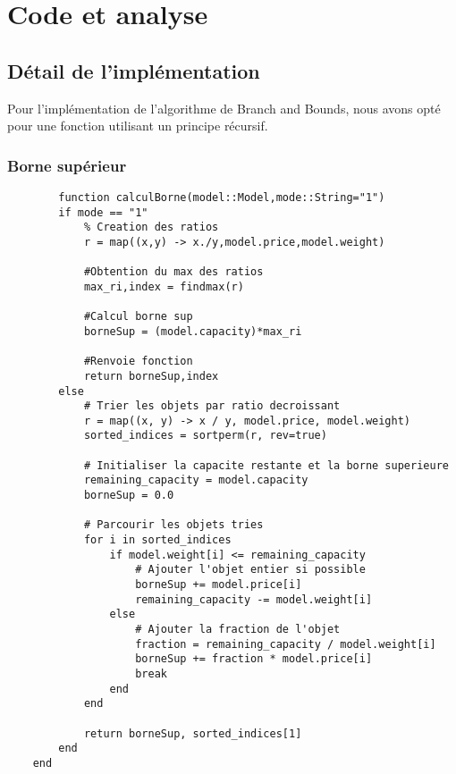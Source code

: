 \section {Code et analyse}
\subsection{Détail de l'implémentation}

Pour l'implémentation de l'algorithme de Branch and Bounds, nous avons opté pour une fonction utilisant un principe récursif.

\subsubsection{Borne supérieur}

\begin{lstlisting}
        function calculBorne(model::Model,mode::String="1")
        if mode == "1"
            % Creation des ratios
            r = map((x,y) -> x./y,model.price,model.weight)
    
            #Obtention du max des ratios
            max_ri,index = findmax(r)
    
            #Calcul borne sup
            borneSup = (model.capacity)*max_ri
    
            #Renvoie fonction
            return borneSup,index
        else
            # Trier les objets par ratio decroissant
            r = map((x, y) -> x / y, model.price, model.weight)
            sorted_indices = sortperm(r, rev=true)
            
            # Initialiser la capacite restante et la borne superieure
            remaining_capacity = model.capacity
            borneSup = 0.0
    
            # Parcourir les objets tries
            for i in sorted_indices
                if model.weight[i] <= remaining_capacity
                    # Ajouter l'objet entier si possible
                    borneSup += model.price[i]
                    remaining_capacity -= model.weight[i]
                else
                    # Ajouter la fraction de l'objet
                    fraction = remaining_capacity / model.weight[i]
                    borneSup += fraction * model.price[i]
                    break
                end
            end
    
            return borneSup, sorted_indices[1]
        end
    end
\end{lstlisting}

